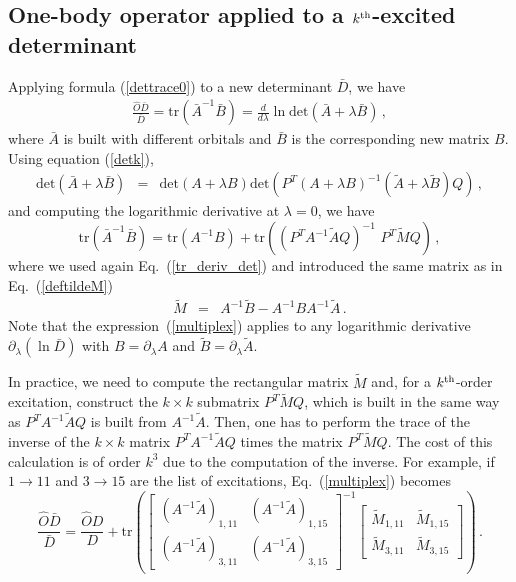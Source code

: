 \documentclass[aip,jcp,reprint,floatfix,onecolumn]{revtex4-1}
\def\det{\text{det}}
\def\tr{\text{tr}}
\def\A{A}
\def\Al{B}
\def\aa{A^{-1}\tilde{A}}
\def\wdet{D}
\begin{document}
\subsection{One-body operator applied to a $k^{\rm th}$-excited  determinant }
\label{O_multi-det}

Applying formula (\ref{dettrace0}) to a new determinant $\bar{\wdet}$, we have
\begin{eqnarray}
\frac{\hat{O} \bar{\wdet}} {\bar{\wdet}} =
\tr (\bar{A}^{-1} \bar{B}) =
\frac{d}{d\lambda}\ln \det (\bar{\A} + \lambda {\bar B})\,,
\label{onewdet}
\end{eqnarray}
where $\bar{A}$ is built with different orbitals and $\bar{B}$ is the corresponding new matrix $B$.
Using equation (\ref{detk}),
\begin{eqnarray}
 \det (\bar{A}+\lambda \bar{B}) &= & \det (\A+\lambda B) \det ( P^T (\A+\lambda B) ^{-1} (\tilde{\A}+\lambda \tilde{B}) Q)\,,
\nonumber
\end{eqnarray}
and computing the logarithmic derivative at $\lambda=0$, we have
\begin{equation}
\tr (\bar{A}^{-1} \bar{B})
= \tr (\A^{-1} \Al) + \tr  ( (P^T \A^{-1} \tilde{\A}Q)^{-1}\,\, {P^T} \tilde{M}Q )\,,
\label{multiplex}
\end{equation}
where we used again Eq.~(\ref{tr_deriv_det}) and introduced the same matrix as  in Eq.~(\ref{deftildeM})
\begin{eqnarray}
\tilde{M} & = & \A^{-1} \tilde{\Al}-A^{-1}B A^{-1}  \tilde{\A} \,. \nonumber
\end{eqnarray}
Note that the  expression~(\ref{multiplex})  applies to any logarithmic derivative $\partial_\lambda (\ln \bar{D})$ with $B=\partial_\lambda A$
and $\tilde{B}=\partial_\lambda \tilde{A}$.

In practice, we  need to compute the rectangular matrix $\tilde{M}$
and, for a $k^{\rm th}$-order excitation, construct the $k\times k$ submatrix $P^T \tilde{M}Q$, which is built in the same way as $P^T A^{-1}\tilde{A}Q$ is built from $A^{-1}\tilde{A}$.
Then, one has to perform the trace of the inverse of the $k\times k$ matrix $P^T A^{-1}\tilde{A}Q$ times the matrix $P^T\tilde{M}Q$. The cost of this calculation is of order $k^3$  due to the computation of the inverse.
For example, if $1 \to 11$ and $3 \to 15$ are the list of excitations,
Eq.~(\ref{multiplex}) becomes
\begin{equation}
\frac{\hat{O}\bar{\wdet}}{\bar{\wdet}} = \frac{\hat{O}\wdet}{\wdet} +
 \tr \left( \left[ \begin{matrix} (\aa)_{1,11} & (\aa)_{1,15}   \\
                      (\aa)_{3,11} & (\aa)_{3,15}
\end{matrix} \right]^{-1} \left[
\begin{matrix} \tilde{M}_{1,11} & \tilde{M}_{1,15}   \\
                      \tilde{M}_{3,11} & \tilde{M}_{3,15}
\end{matrix}  \right]
 \right)\,.
\end{equation}
\end{document}
